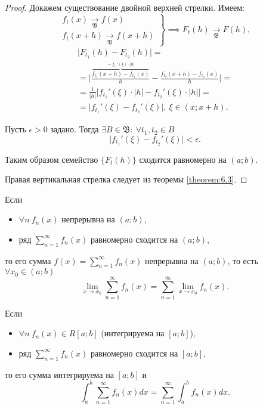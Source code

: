 \begin{proof}
    Докажем существование двойной верхней стрелки. Имеем:
    \[
        \left.\begin{array}{c}
            f_t(x) \xrightarrow[\mathfrak{B}]{} f(x) \\
            f_t(x + h) \xrightarrow[\mathfrak{B}]{} f(x+h)
        \end{array}\right\} \implies F_t(h) \xrightarrow[\mathfrak{B}]{} F(h),
    \]
    \begin{multline*}
        \big|F_{t_1}(h) - F_{t_2}(h)\big| = \\
        = \bigg| \frac{\overbrace{f_{t_1}(x + h) - f_{t_1}(x)}^{= f_{t_1}'(\xi) \cdot |h|}}{h} - \frac{f_{t_2}(x+h) - f_{t_2}(x)}{h}\bigg| = \\
        = \frac{1}{|h|}\big|f_{t_1}'(\xi) \cdot |h| - f_{t_2}'(\xi)\cdot |h| \big| = \\
        = \big|f_{t_1}'(\xi) - f_{t_2}'(\xi)\big|, \ \xi \in (x;x+h).
    \end{multline*}

    Пусть $\epsilon > 0$ задано. Тогда $\exists B \in \mathfrak{B}: \ \forall t_1,t_2 \in B$
    \[
        \big|f_{t_1}'(\xi) - f_{t_2}'(\xi)\big| < \epsilon.
    \]

    Таким образом семейство $\big\{F_t(h)\big\}$ сходится равномерно на $(a;b)$.

    Правая вертикальная стрелка следует из теоремы \ref{theorem:6.3}.
\end{proof}

\begin{corollary}
    Если
    \begin{itemize}
        \item $\forall n \ f_n(x)$ непрерывна на $(a;b)$,
        \item ряд $\sum_{n = 1}^{\infty} f_n(x)$ равномерно сходится на $(a;b)$,
    \end{itemize}
    то его сумма $f(x) = \sum_{n=1}^{\infty}f_n(x)$ непрерывна на $(a;b)$, то есть $\forall x_0 \in (a;b)$
    \[
        \underset{x\rightarrow x_0}{\lim}\sum_{n=1}^{\infty}f_n(x) = \sum_{n=1}^{\infty}\underset{x\rightarrow x_0}{\lim}f_n(x).
    \]
\end{corollary}

\begin{corollary}
    Если
    \begin{itemize}
        \item $\forall n \ f_n(x) \in R[a;b]$ (интегрируема на $[a;b]$),
        \item ряд $\sum_{n=1}^{\infty}f_n(x)$ равномерно сходится на $[a;b]$,
    \end{itemize}
    то его сумма интегрируема на $[a;b]$ и
    \[
        \int_{a}^{b}\sum_{n=1}^{\infty}f_n(x)dx = \sum_{n=1}^{\infty}\int_{a}^{b}f_n(x)dx.
    \]
\end{corollary}

